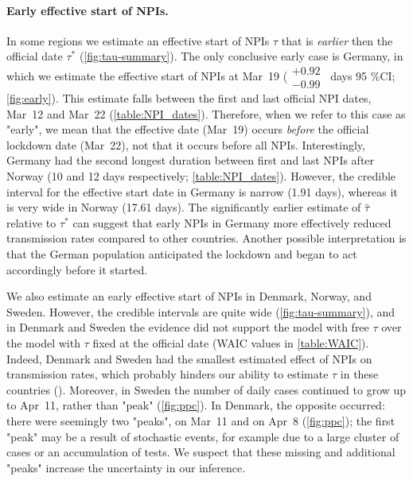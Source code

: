 \documentclass[12pt]{extarticle}
\begin{document}
\paragraph*{Early effective start of NPIs.}
In some regions we estimate an effective start of NPIs $\tau$ that is \emph{earlier} then the official date $\tau^*$ (\autoref{fig:tau-summary}).
The only conclusive early case is Germany, in which we estimate the effective start of NPIs at Mar~19 ($\substack{+0.92 \\ -0.99}$~days 95 \%CI; \autoref{fig:early}).
This estimate falls between the first and last official NPI dates, Mar~12 and Mar~22 (\autoref{table:NPI_dates}). Therefore, when we refer to this case as "early", we mean that the effective date (Mar~19) occurs \emph{before} the official lockdown date (Mar~22), not that it occurs before all NPIs.
Interestingly, Germany had the second longest duration between first and last NPIs after Norway (10 and 12 days respectively; \autoref{table:NPI_dates}).
However, the credible interval for the effective start date in Germany is narrow (1.91 days), whereas it is very wide in Norway (17.61 days).
The significantly earlier estimate of $\hat{\tau}$ relative to $\tau^*$ can suggest that early NPIs in Germany more effectively reduced transmission rates compared to other countries. Another possible interpretation is that the German population anticipated the lockdown and began to act accordingly before it started. %

We also estimate an early effective start of NPIs in Denmark, Norway, and Sweden.
However, the credible intervals are quite wide (\autoref{fig:tau-summary}), and in Denmark and Sweden the evidence did not support the model with free $\tau$ over the model with $\tau$ fixed at the official date (WAIC values in \autoref{table:WAIC}). %
Indeed, Denmark and Sweden had the smallest estimated effect of NPIs on transmission rates, which  probably hinders our ability to estimate $\tau$ in these countries ().%
Moreover, in Sweden the number of daily cases continued to grow up to Apr~11, rather than "peak" (\autoref{fig:ppc}). 
In Denmark, the opposite occurred: there were seemingly two "peaks", on Mar~11 and on Apr~8 (\autoref{fig:ppc}); the first "peak" may be a result of stochastic events, for example due to a large cluster of cases or an accumulation of tests.
We suspect that these missing and additional "peaks" increase the uncertainty in our inference.
\end{document}
